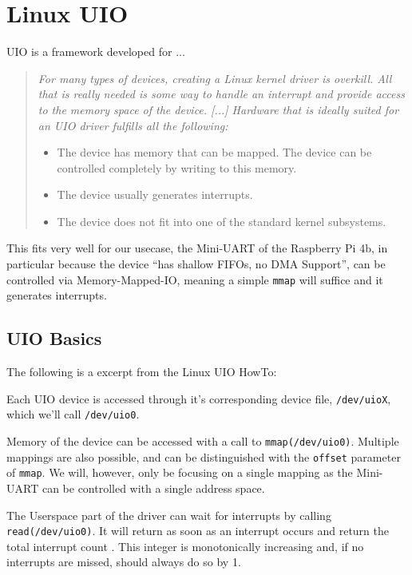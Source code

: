 \documentclass[../main.tex]{subfiles}
\begin{document}
    \clearpage


    \section{Linux UIO}
    UIO is a framework developed for ...


    \begin{quote}
        \it
        For many types of devices, creating a Linux kernel driver is overkill. All that is really needed is some way to handle an interrupt and provide access to the memory space of the device. [...] Hardware that is ideally suited for an UIO driver fulfills all the following:

        \begin{itemize}
            \item The device has memory that can be mapped. The device can be controlled completely by writing to this memory.
            \item The device usually generates interrupts.
            \item The device does not fit into one of the standard kernel subsystems.
        \end{itemize}
    \end{quote}

    This fits very well for our usecase, the Mini-UART of the Raspberry Pi 4b, in particular because the device \enquote{has shallow FIFOs, no DMA Support}, can be controlled via Memory-Mapped-IO, meaning a simple \texttt{mmap} will suffice and it generates interrupts.

    \subsection{UIO Basics}

    The following is a excerpt from the Linux UIO HowTo:

    Each UIO device is accessed through it's corresponding device file, \texttt{/dev/uioX}, which we'll call \texttt{/dev/uio0}.

    Memory of the device can be accessed with a call to \texttt{mmap(/dev/uio0)}. Multiple mappings are also possible, and can be distinguished with the \texttt{offset} parameter of \texttt{mmap}. We will, however, only be focusing on a single mapping as the Mini-UART can be controlled with a single address space.

    The Userspace part of the driver can wait for interrupts by calling \texttt{read(/dev/uio0)}. It will return as soon as an interrupt occurs and return the total interrupt count . This integer is monotonically increasing and, if no interrupts are missed, should always do so by 1.
\end{document}
